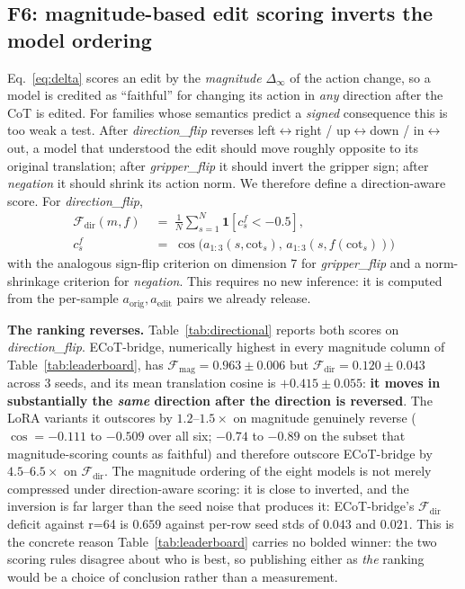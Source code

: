 \documentclass{article}
\begin{document}
\subsection{F6: magnitude-based edit scoring inverts the model ordering}
\label{sec:directional}

Eq.~\ref{eq:delta} scores an edit by the \emph{magnitude} $\Delta_\infty$ of the action change, so a model is credited as ``faithful'' for changing its action in \emph{any} direction after the CoT is edited. For families whose semantics predict a \emph{signed} consequence this is too weak a test. After \emph{direction\_flip} reverses left$\leftrightarrow$right / up$\leftrightarrow$down / in$\leftrightarrow$out, a model that understood the edit should move roughly opposite to its original translation; after \emph{gripper\_flip} it should invert the gripper sign; after \emph{negation} it should shrink its action norm. We therefore define a direction-aware score. For \emph{direction\_flip},
\begin{equation}
\begin{aligned}
\mathcal{F}_{\text{dir}}(m, f) &\;=\; \frac{1}{N}\sum_{s=1}^{N} \mathbf{1}\!\left[c^f_s < -0.5\right],\\
c^f_s &\;=\; \cos\bigl(a_{1:3}(s, \text{cot}_s),\, a_{1:3}(s, f(\text{cot}_s))\bigr)
\end{aligned}
\label{eq:fdir}
\end{equation}
with the analogous sign-flip criterion on dimension 7 for \emph{gripper\_flip} and a norm-shrinkage criterion for \emph{negation}. This requires no new inference: it is computed from the per-sample $a_{\text{orig}}, a_{\text{edit}}$ pairs we already release.

\textbf{The ranking reverses.} Table~\ref{tab:directional} reports both scores on \emph{direction\_flip}. ECoT-bridge, numerically highest in every magnitude column of Table~\ref{tab:leaderboard}, has $\mathcal{F}_{\text{mag}}{=}0.963 \pm 0.006$ but $\mathcal{F}_{\text{dir}}{=}0.120 \pm 0.043$ across 3 seeds, and its mean translation cosine is $+0.415 \pm 0.055$: \textbf{it moves in substantially the \emph{same} direction after the direction is reversed}. The LoRA variants it outscores by $1.2\text{--}1.5\times$ on magnitude genuinely reverse ($\cos = -0.111$ to $-0.509$ over all six; $-0.74$ to $-0.89$ on the subset that magnitude-scoring counts as faithful) and therefore outscore ECoT-bridge by $4.5\text{--}6.5\times$ on $\mathcal{F}_{\text{dir}}$. The magnitude ordering of the eight models is not merely compressed under direction-aware scoring: it is close to inverted, and the inversion is far larger than the seed noise that produces it: ECoT-bridge's $\mathcal{F}_{\text{dir}}$ deficit against r=64 is $0.659$ against per-row seed stds of $0.043$ and $0.021$. This is the concrete reason Table~\ref{tab:leaderboard} carries no bolded winner: the two scoring rules disagree about who is best, so publishing either as \emph{the} ranking would be a choice of conclusion rather than a measurement.
\end{document}
